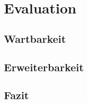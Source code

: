 \newpage
\restoregeometry
\section{Evaluation}
\subsection{Wartbarkeit}
\subsection{Erweiterbarkeit}
\subsection{Fazit}

